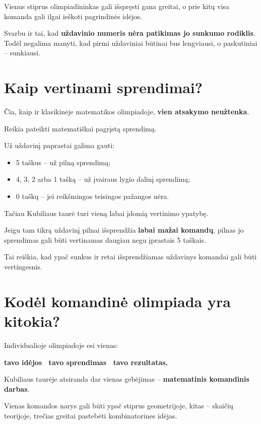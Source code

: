 \documentclass[11pt,a4paper]{article}
\begin{document}
Vienus stiprus olimpiadininkas gali išspręsti gana greitai, o prie kitų visa komanda gali ilgai ieškoti pagrindinės idėjos.

Svarbu ir tai, kad \textbf{uždavinio numeris nėra patikimas jo sunkumo rodiklis}. Todėl negalima manyti, kad pirmi uždaviniai būtinai bus lengviausi, o paskutiniai – sunkiausi.

\section{Kaip vertinami sprendimai?}

Čia, kaip ir klasikinėje matematikos olimpiadoje, \textbf{vien atsakymo neužtenka}.

Reikia pateikti matematiškai pagrįstą sprendimą.

Už uždavinį paprastai galima gauti:
\begin{itemize}
  \item 5 taškus – už pilną sprendimą;
  \item 4, 3, 2 arba 1 tašką – už įvairaus lygio dalinį sprendimą;
  \item 0 taškų – jei reikšmingos teisingos pažangos nėra.
\end{itemize}

Tačiau Kubiliaus taurė turi vieną labai įdomią vertinimo ypatybę.

Jeigu tam tikrą uždavinį pilnai išsprendžia \textbf{labai mažai komandų}, pilnas jo sprendimas gali būti vertinamas daugiau negu įprastais 5 taškais.

Tai reiškia, kad ypač sunkus ir retai išsprendžiamas uždavinys komandai gali būti vertingesnis.

\section{Kodėl komandinė olimpiada yra kitokia?}

Individualioje olimpiadoje esi vienas:

\begin{center}
\textbf{tavo idėjos \textrightarrow\ tavo sprendimas \textrightarrow\ tavo rezultatas.}
\end{center}

Kubiliaus taurėje atsiranda dar vienas gebėjimas – \textbf{matematinis komandinis darbas}.

Vienas komandos narys gali būti ypač stiprus geometrijoje, kitas – skaičių teorijoje, trečias greitai pastebėti kombinatorines idėjas.
\end{document}
